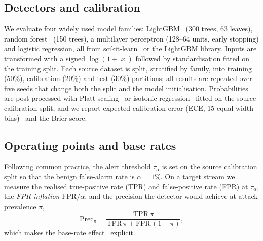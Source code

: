 \subsection{Detectors and calibration}
We evaluate four widely used model families: LightGBM~\cite{ke2017lightgbm} (300 trees, 63 leaves), random forest~\cite{breiman2001random} (150 trees), a multilayer perceptron (128--64 units, early stopping) and logistic regression, all from scikit-learn~\cite{pedregosa2011scikit} or the LightGBM library. Inputs are transformed with a signed $\log(1+|x|)$ followed by standardisation fitted on the training split. Each source dataset is split, stratified by family, into training (50\%), calibration (20\%) and test (30\%) partitions; all results are repeated over five seeds that change both the split and the model initialisation.
Probabilities are post-processed with Platt scaling~\cite{platt1999probabilistic} or isotonic regression~\cite{zadrozny2002transforming} fitted on the source calibration split, and we report expected calibration error (ECE, 15 equal-width bins)~\cite{naeini2015obtaining,guo2017calibration} and the Brier score.

\subsection{Operating points and base rates}
Following common practice, the alert threshold $\tau_\alpha$ is set on the source calibration split so that the benign false-alarm rate is $\alpha=1\%$. On a target stream we measure the realised true-positive rate (TPR) and false-positive rate (FPR) at $\tau_\alpha$, the \emph{FPR inflation} $\mathrm{FPR}/\alpha$, and the precision the detector would achieve at attack prevalence $\pi$,
\begin{equation}
\mathrm{Prec}_\pi=\frac{\mathrm{TPR}\,\pi}{\mathrm{TPR}\,\pi+\mathrm{FPR}\,(1-\pi)},
\end{equation}
which makes the base-rate effect~\cite{axelsson2000base} explicit.

